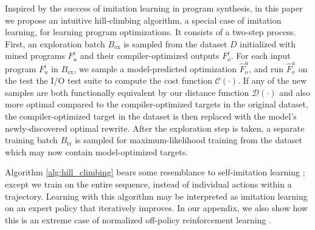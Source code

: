 \documentclass{article}
\begin{document}
Inspired by the success of imitation learning in program synthesis, in this paper we propose an intuitive hill-climbing algorithm, a special case of imitation learning, for learning program optimizations. 
It consists of a two-step process. 
First, an exploration batch $B_{\mathrm{ex}}$ is sampled from the dataset $D$ initialized with mined programs $F^i_u$ and their compiler-optimized outputs $F^i_o$. 
For each input program $F^i_u$ in $B_{\mathrm{ex}}$, we sample a model-predicted optimization $\hat{F}^u_o$, and run $\hat{F}^u_o$ on the test the I/O test suite to compute the cost function $\mathcal{C}(\cdot)$.
If any of the new samples are both functionally equivalent by our distance function $\mathcal{D}(\cdot)$ and also more optimal compared to the compiler-optimized targets in the original dataset, the compiler-optimized target in the dataset is then replaced with the model's newly-discovered optimal rewrite. 
After the exploration step is taken, a separate training batch $B_{\mathrm{tr}}$ is sampled for maximum-likelihood training from the dataset which may now contain model-optimized targets. 

Algorithm \ref{alg:hill_climbing} bears some resemblance to self-imitation learning \cite{oh2018self} ; except we train on the entire sequence, instead of individual actions within a trajectory. Learning with this algorithm may be interpreted as imitation learning on an expert policy that iteratively improves. In our appendix, we also show how this is an extreme case of normalized off-policy reinforcement learning . 
\end{document}
